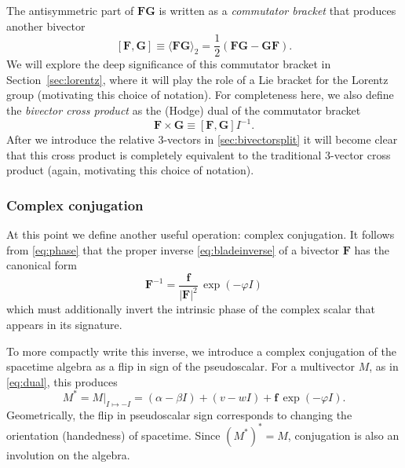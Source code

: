 \documentclass[1p,sort&compress]{elsarticle}
\numberwithin{equation}{section}
\newcommand{\bv}[1]{\mathbf{#1}}
\newcommand{\mean}[1]{\langle #1 \rangle}
\begin{document}
The antisymmetric part of $\bv{FG}$ is written as a \emph{commutator bracket} that produces another bivector
\begin{equation}\label{eq:commutatorbracket}
  [\bv{F},\bv{G}] \equiv \mean{\bv{F}\bv{G}}_2 = \frac{1}{2}(\bv{F G} - \bv{G F}).
\end{equation}
We will explore the deep significance of this commutator bracket in Section~\ref{sec:lorentz}, where it will play the role of a Lie bracket for the Lorentz group (motivating this choice of notation).  For completeness here, we also define the \emph{bivector cross product} as the (Hodge) dual of the commutator bracket
\begin{equation}\label{eq:crossproduct}
  \bv{F}\times \bv{G} \equiv [\bv{F}, \bv{G}]I^{-1}.
\end{equation}
After we introduce the relative 3-vectors in \ref{sec:bivectorsplit} it will become clear that this cross product is completely equivalent to the traditional 3-vector cross product (again, motivating this choice of notation).


\subsubsection{Complex conjugation}\label{sec:conjugation}


At this point we define another useful operation: complex conjugation.  It follows from \eqref{eq:phase} that the proper inverse \eqref{eq:bladeinverse} of a bivector $\bv{F}$ has the canonical form
\begin{equation}
  \bv{F}^{-1} = \frac{\bv{f}}{|\bv{F}|^2}\, \exp(-\varphi I)
\end{equation}
which must additionally invert the intrinsic phase of the complex scalar that appears in its signature.

To more compactly write this inverse, we introduce a complex conjugation of the spacetime algebra as a flip in sign of the pseudoscalar.  For a multivector $M$, as in \eqref{eq:dual}, this produces
\begin{equation}\label{eq:conjugation}
  M^* = M|_{I\mapsto -I} = (\alpha - \beta I) + (v - wI) + \bv{f}\, \exp(-\varphi I).
\end{equation}
Geometrically, the flip in pseudoscalar sign corresponds to changing the orientation (handedness) of spacetime.  Since $(M^*)^* = M$, conjugation is also an involution on the algebra.  
\end{document}
